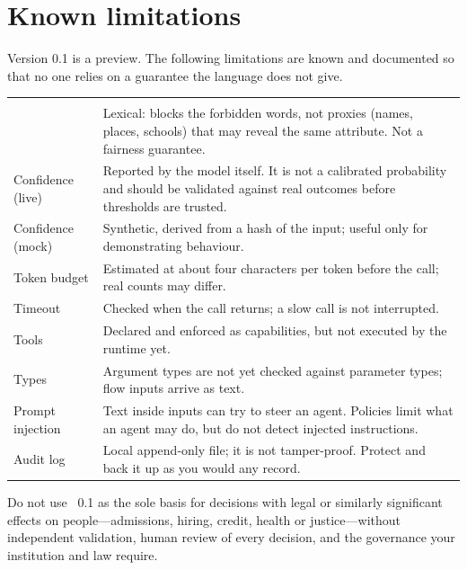 \section{Known limitations}
\label{sec:limits}

Version 0.1 is a preview. The following limitations are known and documented so that no one relies on a guarantee the language does not give.

\begin{center}
\small
\begin{tabularx}{\linewidth}{@{}L{3.4cm}Y@{}}
\toprule
{} & \\
\goldrule
{} & Lexical: blocks the forbidden words, not proxies (names, places, schools) that may reveal the same attribute. Not a fairness guarantee.\\
Confidence (live) & Reported by the model itself. It is not a calibrated probability and should be validated against real outcomes before thresholds are trusted.\\
Confidence (mock) & Synthetic, derived from a hash of the input; useful only for demonstrating behaviour.\\
Token budget & Estimated at about four characters per token before the call; real counts may differ.\\
Timeout & Checked when the call returns; a slow call is not interrupted.\\
Tools & Declared and enforced as capabilities, but not executed by the runtime yet.\\
Types & Argument types are not yet checked against parameter types; flow inputs arrive as text.\\
Prompt injection & Text inside inputs can try to steer an agent. Policies limit what an agent may do, but do not detect injected instructions.\\
Audit log & Local append-only file; it is not tamper-proof. Protect and back it up as you would any record.\\
\bottomrule
\end{tabularx}
\end{center}

\begin{caution}
Do not use \algolang~0.1 as the sole basis for decisions with legal or similarly significant effects on people---admissions, hiring, credit, health or justice---without independent validation, human review of every decision, and the governance your institution and law require.
\end{caution}

